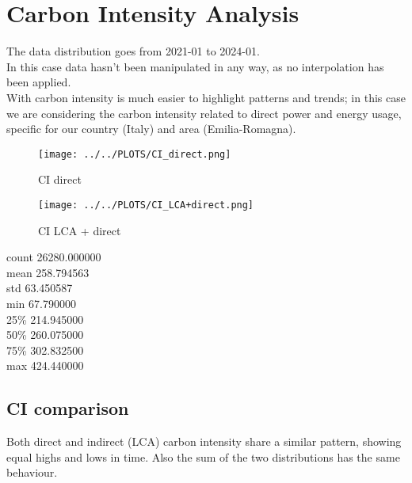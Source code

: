 \section{Carbon Intensity Analysis}
The data distribution goes from 2021-01 to 2024-01. \\
In this case data hasn’t been manipulated in any way, as no interpolation has been applied. \\
With carbon intensity is much easier to highlight patterns and trends; in this case we are considering the carbon intensity related to direct power and energy usage, specific for our country (Italy) and area (Emilia-Romagna).

\vspace{-15pt}

\begin{figure}[H]
\centering
\texttt{[image: ../../PLOTS/CI\_direct.png]}
\captionsetup{skip=-10pt}
\caption{CI direct}
\label{fig:CI_direct}
\end{figure}

\vspace{-20pt}

\begin{figure}[H]
\centering
\texttt{[image: ../../PLOTS/CI\_LCA+direct.png]}
\captionsetup{skip=-10pt}
\caption{CI LCA + direct}
\label{CI_LCA+direct}
\end{figure}

\begin{center}
count    26280.000000 \\
mean       258.794563 \\
std         63.450587 \\
min         67.790000 \\
25\%        214.945000 \\
50\%        260.075000 \\
75\%        302.832500 \\
max        424.440000
\end{center}

\subsection{CI comparison}
Both direct and indirect (LCA) carbon intensity share a similar pattern, showing equal highs and lows in time. Also the sum of the two distributions has the same behaviour.  

\vspace{-15pt}

